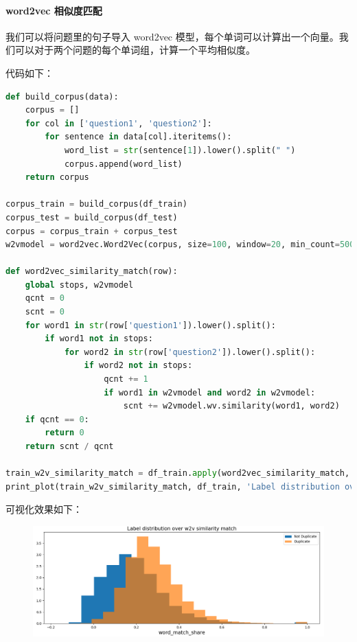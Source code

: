 \documentclass{article}
\begin{document}
\paragraph{word2vec 相似度匹配}

我们可以将问题里的句子导入 word2vec 模型，每个单词可以计算出一个向量。我们可以对于两个问题的每个单词组，计算一个平均相似度。

代码如下：

\begin{lstlisting}[language=python]
def build_corpus(data):
    corpus = []
    for col in ['question1', 'question2']:
        for sentence in data[col].iteritems():
            word_list = str(sentence[1]).lower().split(" ")
            corpus.append(word_list)
    return corpus

corpus_train = build_corpus(df_train)
corpus_test = build_corpus(df_test)
corpus = corpus_train + corpus_test
w2vmodel = word2vec.Word2Vec(corpus, size=100, window=20, min_count=500, workers=4)

def word2vec_similarity_match(row):
    global stops, w2vmodel
    qcnt = 0
    scnt = 0
    for word1 in str(row['question1']).lower().split():
        if word1 not in stops:
            for word2 in str(row['question2']).lower().split():
                if word2 not in stops:
                    qcnt += 1
                    if word1 in w2vmodel and word2 in w2vmodel:
                        scnt += w2vmodel.wv.similarity(word1, word2)
    if qcnt == 0:
        return 0
    return scnt / qcnt

train_w2v_similarity_match = df_train.apply(word2vec_similarity_match, axis=1, raw=True)
print_plot(train_w2v_similarity_match, df_train, 'Label distribution over w2v similarity match', '3.png')
\end{lstlisting}

可视化效果如下：

\begin{figure}[!h]
\centering
\includegraphics[scale=0.5]{3.png}
\end{figure}
\end{document}
